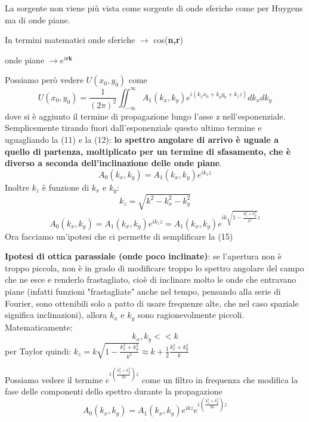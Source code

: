 \documentclass{article}
\begin{document}
La sorgente non viene più vista come sorgente di onde sferiche come per Huygens ma di onde piane.

In termini matematici onde sferiche $\longrightarrow$ cos(\textbf{n,r})

onde piane $\longrightarrow  e^{i \textbf{r} \textbf{k}}$

Possiamo però vedere $U(x_{0},y_{0})$ come
\begin{equation}
U(x_{0},y_{0})=\frac{1}{(2\pi)^{2}}\iint_{-\infty}^{\infty} A_{1}(k_{x},k_{y}) e^{i( k_{x} x_{0} +k_{y} y_{0} +k_{z} z)}dk_{x}dk_{y}
\end{equation}
dove si è aggiunto il termine di propagazione lungo l'asse z nell'esponenziale.
Semplicemente tirando fuori dall'esponenziale questo ultimo termine e uguagliando la (11) e la (12): 
\textbf{lo spettro angolare di arrivo è uguale a quello di partenza, moltiplicato per un termine di sfasamento, che è diverso a seconda dell'inclinazione delle onde piane}.
\begin{equation}
A_{0}(k_{x},k_{y})=A_{1}(k_{x},k_{y})e^{ik_{z}z}
\end{equation}
Inoltre $k_{z}$ è funzione di $k_{x}$ e $k_{y}$:
\begin{equation}
k_{z}=\sqrt{k ^{2} - k_{x} ^{2} - k_{y} ^{2}}
\end{equation}
\begin{equation}
 A_{0}(k_{x},k_{y})=A_{1}(k_{x},k_{y}) e^{i k_{z} z} = A_{1}(k_{x},k_{y}) e^{i k \sqrt{1 - \frac{ k_{x} ^{2} + k_{y} ^{2}}{k^{2}}} z}
\end{equation}
Ora facciamo un'ipotesi che ci permette di semplificare la (15)

\textbf{Ipotesi di ottica parassiale (onde poco inclinate)}:
se l'apertura non è troppo piccola, non è in grado di modificare troppo lo spettro angolare del campo che ne esce e renderlo frastagliato, cioè di inclinare molto le onde che entravano piane (infatti funzioni "frastagliate" anche nel tempo, pensando alla serie di Fourier, sono ottenibili solo a patto di usare frequenze alte, che nel caso spaziale significa inclinazioni), allora $k_{x}$ e $k_{y}$ sono ragionevolmente piccoli.
Matematicamente:
\begin{equation}
k_{x},k_{y} << k    
\end{equation}
per Taylor quindi: $k_{z}=k \sqrt{1 - \frac{ k_{x} ^{2} + k_{y} ^{2} }{ k^{2} }}\approx k +\frac{1}{2} \frac{k_{x} ^{2} + k_{y} ^{2}}{k}$

Possiamo vedere il termine $ e^{i (\frac{k_{x} ^{2} + k_{y} ^{2} }{2k})z} $ come un filtro in frequenza che modifica la fase delle componenti dello spettro durante la propagazione
\begin{equation}
A_{0}(k_{x},k_{y})=A_{1}(k_{x},k_{y}) e^{i k z}e^{i (\frac{k_{x} ^{2} + k_{y} ^{2} }{2k})z}
\end{equation}
\end{document}
